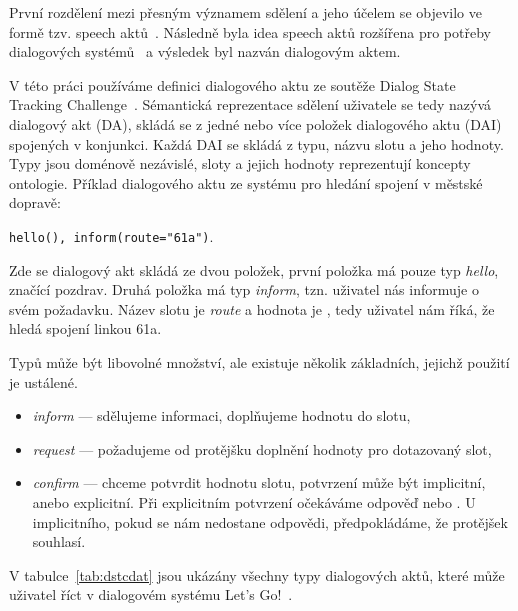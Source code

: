 První rozdělení mezi přesným významem sdělení a jeho účelem se objevilo ve formě tzv. speech aktů~\cite{austin1975things}.
Následně byla idea speech aktů rozšířena pro potřeby dialogových systémů~\cite{traum1999speech} a výsledek byl nazván dialogovým aktem.

V této práci používáme definici dialogového aktu ze soutěže Dialog State Tracking Challenge~\cite{williamsdialog}.
Sémantická reprezentace sdělení uživatele se tedy nazývá dialogový akt (DA), skládá se z jedné nebo více položek dialogového aktu (DAI) spojených v konjunkci.
Každá DAI se skládá z typu, názvu slotu a jeho hodnoty. 
Typy jsou doménově nezávislé, sloty a jejich hodnoty reprezentují koncepty ontologie.
Příklad dialogového aktu ze systému pro hledání spojení v městské dopravě:

\begin{center}
{\tt hello(), inform(route="61a")}.
\end{center}

Zde se dialogový akt skládá ze dvou položek, první položka má pouze typ {\em hello}, značící pozdrav.
Druhá položka má typ {\em inform}, tzn. uživatel nás informuje o svém požadavku.
Název slotu je {\em route} a hodnota je , tedy uživatel nám říká, že hledá spojení linkou 61a.

Typů může být libovolné množství, ale existuje několik základních, jejichž použití je ustálené.
\begin{itemize}
\item {\em inform} --- sdělujeme informaci, doplňujeme hodnotu do slotu,
\item {\em request} --- požadujeme od protějšku doplnění hodnoty pro dotazovaný slot,
\item {\em confirm} --- chceme potvrdit hodnotu slotu, potvrzení může být implicitní, anebo explicitní.
	Při explicitním potvrzení očekáváme odpověď  nebo .
	U implicitního, pokud se nám nedostane odpovědi, předpokládáme, že protějšek souhlasí.
\end{itemize}

V tabulce~\ref{tab:dstcdat} jsou ukázány všechny typy dialogových aktů, které může uživatel říct v dialogovém systému Let's Go!~\cite{williamsdialog}.

